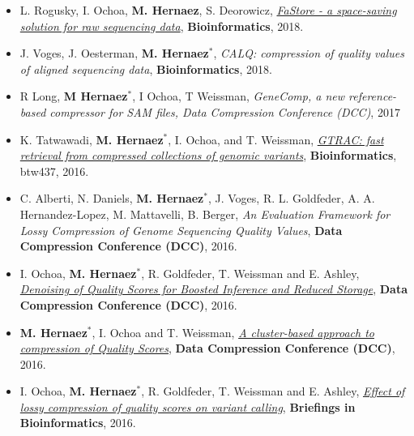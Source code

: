 \documentclass[11pt,a4paper,sans]{moderncv}        %
\begin{document}
\begin{itemize}
\item L. Rogusky, I. Ochoa, \textbf{M. Hernaez}, S. Deorowicz, \href{https://academic.oup.com/bioinformatics/article/34/16/2748/4956350}{\textsl{FaStore - a space-saving solution for raw sequencing data}}, \textbf{Bioinformatics}, 2018.\\

\item J. Voges, J. Oesterman, \textbf{M. Hernaez}$^\ast$, {\textsl{CALQ: compression of quality values of aligned sequencing data}}, \textbf{Bioinformatics}, 2018.\\

\item R Long, \textbf{M Hernaez}$^\ast$, I Ochoa, T Weissman, \textsl{GeneComp, a new reference-based compressor for SAM files, Data Compression Conference (DCC)}, 2017\\

\item K. Tatwawadi, \textbf{M. Hernaez}$^\ast$, I. Ochoa, and T. Weissman, \href{http://idoia.ece.illinois.edu/papers/2016_gtrac_paper.pdf}{\textsl{GTRAC: fast retrieval from compressed collections of genomic variants}}, \textbf{Bioinformatics}, btw437, 2016.\\

\item C. Alberti, N. Daniels, \textbf{M. Hernaez}$^\ast$, J. Voges, R. L. Goldfeder, A. A. Hernandez-Lopez, M. Mattavelli, B. Berger, \emph{An Evaluation Framework for Lossy Compression of Genome Sequencing Quality Values},  {\textbf{ Data Compression Conference (DCC)}}, 2016. \\

\item I. Ochoa, \textbf{M. Hernaez}$^\ast$, R. Goldfeder, T. Weissman and E. Ashley, \href{http://web.stanford.edu/~iochoa/publishedPublications/2015_dcc_denoising.pdf}{\emph{ Denoising of Quality Scores for Boosted Inference and Reduced Storage}}, {\textbf{ Data Compression Conference (DCC)}}, 2016. \\

\item  \textbf{M. Hernaez}$^\ast$, I. Ochoa and T. Weissman, \href{http://web.stanford.edu/~iochoa/publishedPublications/2015_dcc_markovmixture.pdf}{\emph{ A cluster-based approach to compression of Quality Scores}}, {\textbf{ Data Compression Conference (DCC)}}, 2016. \\

\item I. Ochoa, \textbf{M. Hernaez}$^\ast$, R. Goldfeder, T. Weissman and E. Ashley, \href{http://web.stanford.edu/~iochoa/publishedPublications/2015_effectLossyCompression.pdf}{\textsl{ Effect of lossy compression of quality scores on variant calling}}, \textbf{ Briefings in Bioinformatics}, 2016.\\


\end{itemize}
\end{document}
